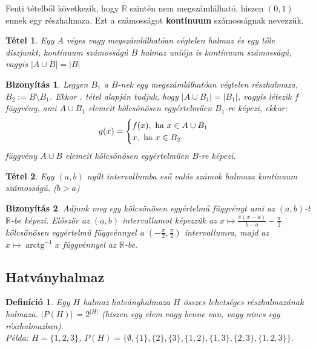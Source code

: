 \documentclass[a4paper,12pt,twoside]{book}
\newcommand{\R}{\mathbb{R}}
\DeclareMathOperator{\arctg}{arctg}
\newtheorem{defi}{Definíció}[chapter]
\newtheorem{tetel}{Tétel}[chapter]
\newtheorem{biz}{Bizonyítás}[chapter]
\theoremstyle{break}
\begin{document}
Fenti tételből következik, hogy $\R$ szintén nem megszámlálható, hiszen $(0,1)$ ennek egy részhalma\-za. Ezt a számosságot \textbf{kontínuum} számosságnak nevezzük.

\begin{tetel}
 Egy $A$ véges vagy megszámlálhatóan végtelen halmaz és egy tőle diszjunkt, kontínuum számosságú $B$ halmaz uniója is kontínuum számosságú, vagyis $|A\cup B| = |B|$
\end{tetel}
\begin{biz}
 Legyen $B_1$ a $B$-nek egy megszámlálhatóan végtelen részhalmaza, $B_2 := B\setminus B_1$. Ekkor . tétel alapján tudjuk, hogy $|A\cup B_1| = |B_1|$, vagyis létezik $f$ függvény, ami $A\cup B_1$ elemeit kölcsönösen egyértelműen $B_1$-re képezi, ekkor:
  \[g(x) = \begin{cases}
    f(x), \hbox{ ha } x\in A\cup B_1\\
    x, \hbox{ ha } x\in B_2
\end{cases}\]
függvény $A\cup B$ elemeit kölcsönösen egyértelműen $B$-re képezi.
\end{biz}

\begin{tetel}
 Egy $(a,b)$ nyílt intervallumba eső valós számok halmaza kontínuum számosságú. ($b>a$)
\end{tetel}
\begin{biz}
 Adjunk meg egy kölcsönösen egyértelmű függvényt ami az $(a,b)$-t $\R$-be képezi. Először az $(a,b)$ intervallumot képezzük az $x \mapsto \frac{\pi(x-a)}{b-a}-\frac{\pi}{2}$ kölcsönösen egyértelmű függvénnyel a $(-\frac{\pi}{2},\frac{\pi}{2})$ intervallumra, majd az $x \mapsto \arctg^{-1} x$ függvénnyel az $\R$-be.
\end{biz}

\subsection{Hatványhalmaz}

\begin{defi} Egy $H$ halmaz hatványhalmaza $H$ összes lehetséges részhalmazának halmaza. $|P(H)|$ = $2^{|H|}$ (hiszen egy elem vagy benne van, vagy nincs egy részhalmazban).\\
\emph{Példa}: $H = \{1,2,3\}$, $P(H) = \{\emptyset, \{1\}, \{2\}, \{3\}, \{1,2\},\{1,3\},\{2,3\}, \{1,2,3\}\}$.
\end{defi}
\end{document}
